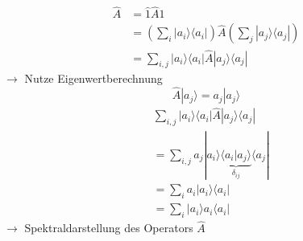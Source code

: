 \documentclass[10pt,article,colorback,accentcolor=tud9d]{scrartcl}
\begin{document}
\begin{itemize}
\begin{equation}
    \begin{aligned}
    \hat{A} &= \hat{1}\hat{A}\hat{1}\\
    &=\left(\sum_i|a_i\rangle \langle a_i|\right)\hat{A}\left(\sum_j|a_j\rangle \langle a_j|\right)\\
    &=\sum_{i,j}|a_i\rangle \langle a_i|\hat{A}|a_j\rangle \langle a_j|
    \end{aligned}
    \end{equation}
    $\rightarrow$ Nutze Eigenwertberechnung
    \begin{equation}
    \hat{A}|a_j\rangle =a_j|a_j\rangle  \nonumber
    \end{equation}
    \begin{equation}
    \begin{aligned}
    &\sum_{i,j}|a_i\rangle \langle a_i|\hat{A}|a_j\rangle \langle a_j|\\
    &=\sum_{i,j}a_j|a_i\rangle \underbrace{\langle a_i|a_j\rangle }_{\delta_{ij}}\langle a_j|\\
    &=\sum_ia_i|a_i\rangle \langle a_i|\\
    &=\sum_i|a_i\rangle a_i\langle a_i|
    \end{aligned}
    \end{equation}
    $\rightarrow$ Spektraldarstellung des Operators $\hat{A}$
  
\end{itemize}
\end{document}
